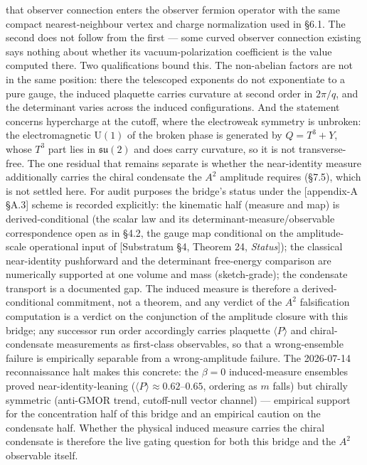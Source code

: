 \documentclass[
]{article}
\begin{document}
that observer connection enters the observer fermion operator with the
same compact nearest-neighbour vertex and charge normalization used in
§6.1. The second does not follow from the first --- some curved observer
connection existing says nothing about whether its vacuum-polarization
coefficient is the value computed there. Two qualifications bound this.
The non-abelian factors are not in the same position: there the
telescoped exponents do not exponentiate to a pure gauge, the induced
plaquette carries curvature at second order in \(2\pi/q\), and the
determinant varies across the induced configurations. And the statement
concerns hypercharge at the cutoff, where the electroweak symmetry is
unbroken: the electromagnetic \(\mathrm{U}(1)\) of the broken phase is
generated by \(Q = T^3 + Y\), whose \(T^3\) part lies in
\(\mathfrak{su}(2)\) and does carry curvature, so it is not
transverse-free. The one residual that remains separate is whether the
near-identity measure additionally carries the chiral condensate the
\(A^2\) amplitude requires (§7.5), which is not settled here. For audit
purposes the bridge's status under the {[}appendix-A §A.3{]} scheme is
recorded explicitly: the kinematic half (measure and map) is
derived-conditional (the scalar law and its
determinant-measure/observable correspondence open as in §4.2, the gauge
map conditional on the amplitude-scale operational input of
{[}Substratum §4, Theorem 24, \emph{Status}{]}); the classical
near-identity pushforward and the determinant free-energy comparison are
numerically supported at one volume and mass (sketch-grade); the
condensate transport is a documented gap. The induced measure is
therefore a derived-conditional commitment, not a theorem, and any
verdict of the \(A^2\) falsification computation is a verdict on the
conjunction of the amplitude closure with this bridge; any successor run
order accordingly carries plaquette \(\langle P \rangle\) and
chiral-condensate measurements as first-class observables, so that a
wrong-ensemble failure is empirically separable from a wrong-amplitude
failure. The 2026-07-14 reconnaissance halt makes this concrete: the
\(\beta=0\) induced-measure ensembles proved near-identity-leaning
(\(\langle P \rangle \approx 0.62\)--\(0.65\), ordering as \(m\) falls)
but chirally symmetric (anti-GMOR trend, cutoff-null vector channel) ---
empirical support for the concentration half of this bridge and an
empirical caution on the condensate half. Whether the physical induced
measure carries the chiral condensate is therefore the live gating
question for both this bridge and the \(A^2\) observable itself.
\end{document}
